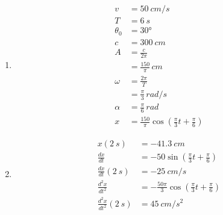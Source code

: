 \documentclass{article}
\begin{document}
\begin{enumerate}
  \item

        \begin{align*}
          v        & = \qty{50}{cm/s}                                                      \\
          T        & = \qty{6}{s}                                                          \\
          \theta_0 & = \ang{30}                                                            \\
          c        & = \qty{300}{cm}                                                       \\
          A        & = \frac{c}{2 \pi}                                                     \\
                   & = \frac{150}{\pi} \,\unit{cm}                                         \\
          \omega   & = \frac{2 \pi}{T}                                                     \\
                   & = \frac{\pi}{3} \,\unit{rad/s}                                        \\
          \alpha   & = \frac{\pi}{6} \,\unit{rad}                                          \\
          x        & = \frac{150}{\pi} \cos \left( \frac{\pi}{3} t + \frac{\pi}{6} \right)
        \end{align*}

  \item

        \begin{align*}
          x(\qty{2}{s})                    & = \qty{-41.3}{cm}                                                       \\
          \frac{d x}{d t}                  & = -50 \sin \left( \frac{\pi}{3} t + \frac{\pi}{6} \right)               \\
          \frac{d x}{d t} (\qty{2}{s})     & = \qty{-25}{cm/s}                                                       \\
          \frac{d^2 x}{d t^2}              & = -\frac{50 \pi}{3} \cos \left( \frac{\pi}{3} t + \frac{\pi}{6} \right) \\
          \frac{d^2 x}{d t^2} (\qty{2}{s}) & = \qty{45}{cm/s^2}
        \end{align*}
\end{enumerate}
\end{document}

